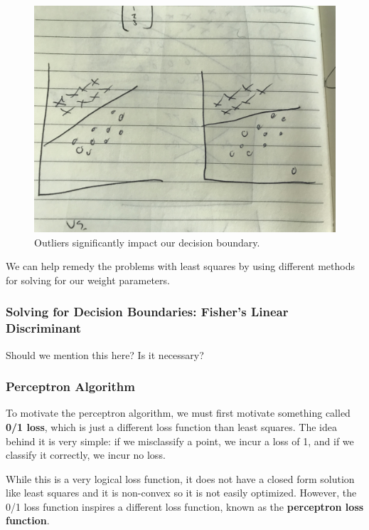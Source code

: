 \begin{figure}
    \centering
    \includegraphics[width=0.5\paperwidth]{../Classification/fig/outlier_phenomenon.jpg}
    \caption{Outliers significantly impact our decision boundary.}
    \label{fig:outlier-phenomenon}
\end{figure}

We can help remedy the problems with least squares by using different methods for solving for our weight parameters.

\subsubsection{Solving for Decision Boundaries: Fisher's Linear Discriminant}
Should we mention this here? Is it necessary?

\subsubsection{Perceptron Algorithm}
To motivate the perceptron algorithm, we must first motivate something called \textbf{0/1 loss}, which is just a different loss function than least squares. The idea behind it is very simple: if we misclassify a point, we incur a loss of 1, and if we classify it correctly, we incur no loss.

While this is a very logical loss function, it does not have a closed form solution like least squares and it is non-convex so it is not easily optimized. However, the 0/1 loss function inspires a different loss function, known as the \textbf{perceptron loss function}.

